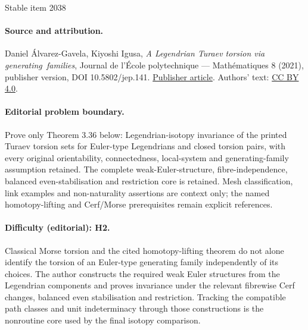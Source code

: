 \documentclass[11pt]{article}
\numberwithin{equation}{section}\providecommand{\dpl}{\displaystyle}
\begin{document}
\begin{center}{\Large Stable item 2038}\end{center}
\paragraph{Source and attribution.}
Daniel Álvarez-Gavela, Kiyoshi Igusa, \emph{A Legendrian Turaev torsion via generating families}, Journal de l’École polytechnique — Mathématiques 8 (2021), publisher version, DOI 10.5802/jep.141. \href{https://jep.centre-mersenne.org/articles/10.5802/jep.141/}{Publisher article}. Authors' text: \href{https://creativecommons.org/licenses/by/4.0/}{CC BY 4.0}.
\paragraph{Editorial problem boundary.}
Prove only Theorem 3.36 below: Legendrian-isotopy invariance of the printed Turaev torsion sets for Euler-type Legendrians and closed torsion pairs, with every original orientability, connectedness, local-system and generating-family assumption retained. The complete weak-Euler-structure, fibre-independence, balanced even-stabilisation and restriction core is retained. Mesh classification, link examples and non-naturality assertions are context only; the named homotopy-lifting and Cerf/Morse prerequisites remain explicit references.
\paragraph{Difficulty (editorial): H2.}
Classical Morse torsion and the cited homotopy-lifting theorem do not alone identify the torsion of an Euler-type generating family independently of its choices. The author constructs the required weak Euler structures from the Legendrian components and proves invariance under the relevant fibrewise Cerf changes, balanced even stabilisation and restriction. Tracking the compatible path classes and unit indeterminacy through those constructions is the nonroutine core used by the final isotopy comparison.
\end{document}
